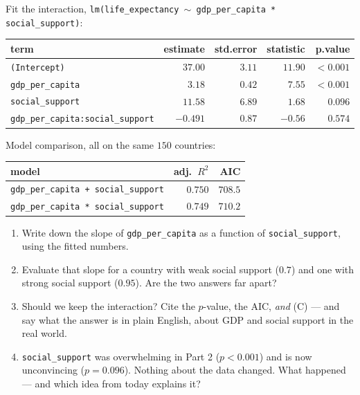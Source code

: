 \documentclass{article}
\begin{document}
Fit the interaction, \texttt{lm(life\_expectancy $\sim$ gdp\_per\_capita * social\_support)}:

\begin{center}
\renewcommand{\arraystretch}{1.3}
\begin{tabular}{lrrrr}
\toprule
term & estimate & std.error & statistic & p.value \\
\midrule
\texttt{(Intercept)}                      & $37.00$  & $3.11$ & $11.90$ & $<0.001$ \\
\texttt{gdp\_per\_capita}                  & $3.18$   & $0.42$ & $7.55$  & $<0.001$ \\
\texttt{social\_support}                   & $11.58$  & $6.89$ & $1.68$  & $0.096$ \\
\texttt{gdp\_per\_capita:social\_support}   & $-0.491$ & $0.87$ & $-0.56$ & $0.574$ \\
\bottomrule
\end{tabular}
\end{center}

\smallskip
\noindent Model comparison, all on the same $150$ countries:

\begin{center}
\begin{tabular}{lrr}
\toprule
model & adj.\ $R^2$ & AIC \\
\midrule
\texttt{gdp\_per\_capita + social\_support} & $0.750$ & $708.5$ \\
\texttt{gdp\_per\_capita * social\_support} & $0.749$ & $710.2$ \\
\bottomrule
\end{tabular}
\end{center}

\begin{enumerate}[label={\bfseries (\Alph*)},itemsep=.8em]
\item Write down the slope of \texttt{gdp\_per\_capita} as a function of \texttt{social\_support}, using the fitted numbers. \\[2.5em]
\item Evaluate that slope for a country with weak social support ($0.7$) and one with strong social support ($0.95$). Are the two answers far apart? \\[3.5em]
\item Should we keep the interaction? Cite the $p$-value, the AIC, \emph{and} (C) --- and say what the answer is in plain English, about GDP and social support in the real world. \\[4.5em]
\item \texttt{social\_support} was overwhelming in Part 2 ($p < 0.001$) and is now unconvincing ($p = 0.096$). Nothing about the data changed. What happened --- and which idea from today explains it? \\[4.5em]
\end{enumerate}
\end{document}
